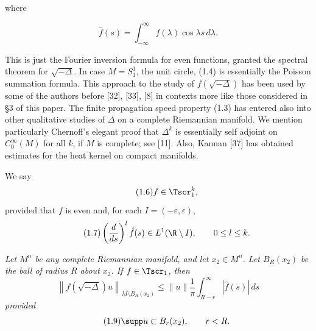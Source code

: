 where

\begin{equation}\tag{1.5}
\hat f(s)=\int_{-\infty}^{\infty}f(\lambda)\cos \lambda s\,d\lambda.
\end{equation}

This is just the Fourier inversion formula for even functions, granted the
spectral theorem for $\sqrt{-\Delta}$. In case $M=S^1_1$, the unit circle, (1.4)
is essentially the Poisson summation formula. This approach to the study of
$f(\sqrt{-\Delta})$ has been used by some of the authors before [32], [33], [8] in
contexts more like those considered in \S3 of this paper. The finite propagation
speed property (1.3) has entered also into other qualitative studies of
$\Delta$ on a complete Riemannian manifold. We mention particularly Chernoff's
elegant proof that $\Delta^k$ is essentially self adjoint on $C_0^\infty(M)$ for all
$k$, if $M$ is complete; see [11]. Also, Kannan [37] has obtained estimates for
the heat kernel on compact manifolds.

\begin{definition}
\label{def:finite-propagation-class}

We say
\begin{equation}\tag{1.6}
f \in \Tscr_1^k,
\end{equation}
provided that $f$ is even and, for each $I = (-\varepsilon, \varepsilon)$,
\begin{equation}\tag{1.7}
\left(\frac{d}{ds}\right)^l \hat{f}(s) \in L^1(\R \setminus I), \qquad 0 \leq l \leq k.
\end{equation}
\end{definition}

\begin{proposition}
\label{prop:tail-estimate}

\textit{Let $M^n$ be any complete Riemannian manifold, and let $x_2 \in M^n$.
Let $B_R(x_2)$ be the ball of radius $R$ about $x_2$. If $f \in \Tscr_1$, then}
\begin{equation}\tag{1.8}
\left\| f(\sqrt{-\Delta})u \right\|_{M \setminus B_R(x_2)}
\leq \|u\| \frac{1}{\pi} \int_{R-r}^{\infty} |\hat{f}(s)|\, ds
\end{equation}
\textit{provided}
\begin{equation}\tag{1.9}
\supp u \subset B_r(x_2), \qquad r < R.
\end{equation}
\end{proposition}


